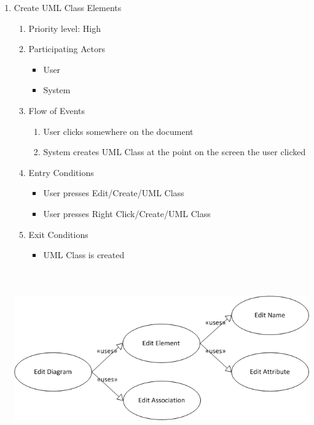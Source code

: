 \documentclass[a4paper, 12pt]{article}
\begin{document}
\begin{enumerate}
\item Create UML Class Elements
  \begin {enumerate}
  \item Priority level: High
  \item Participating Actors
    \begin{itemize}
    \item User
    \item System
    \end {itemize}
  \item Flow of Events
    \begin {enumerate}
    \item User clicks somewhere on the document
    \item System creates UML Class at the point on the screen the user clicked
    \end {enumerate}
  \item Entry Conditions
    \begin {itemize}
    \item User presses Edit/Create/UML Class
    \item User presses Right Click/Create/UML Class
    \end {itemize}
  \item Exit Conditions
    \begin {itemize}
    \item UML Class is created
    \end {itemize}
  \end {enumerate}

  \begin{center}
    \includegraphics[height=3in, width=5in]{img/EditDiagram.png}
  \end{center}


\end{enumerate}
\end{document}
